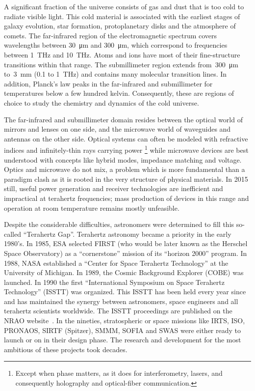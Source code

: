 A significant fraction of the universe consists of gas and dust that is too cold to radiate visible light.
This cold material is associated with the earliest stages of galaxy evolution, star formation, protoplanetary disks and the atmosphere of comets.
%
The far-infrared region of the electromagnetic spectrum covers wavelengths
between \SI{30}{\micro\meter} and \SI{300}{\micro\meter},
which correspond to frequencies
between \SI{1}{\tera\hertz} and \SI{10}{\tera\hertz}.
Atoms and ions have most of their fine-structure transitions within that range.
%
The submillimeter region extends from~\SI{300}{\micro\meter} to~\SI{3}{\milli\meter} (\num{0.1} to \SI{1}{\tera\hertz}) and contains many molecular transition lines.
%
In addition, Planck's law peaks in the far-infrared and submillimeter for temperatures below a few hundred kelvin.
%
Consequently, these are regions of choice to study the chemistry and dynamics of the cold universe.

The far-infrared and submillimeter domain resides between
the optical world of mirrors and lenses on one side,
and the microwave world of waveguides and antennas on the other side.
Optical systems can often be modeled with refractive indices and infinitely-thin rays carrying power%
\footnote{
    Except when phase matters, as it does for interferometry,
    lasers, and consequently holography and optical-fiber communication.
}
while microwave devices are best understood with concepts like hybrid modes, impedance matching and voltage.
Optics and microwave do not mix,
a problem which is more fundamental than a paradigm clash as it is rooted in the very structure of physical materials.
In 2015 still, useful power generation and receiver technologies are inefficient and impractical at terahertz frequencies;
mass production of devices in this range and operation at room temperature remains mostly unfeasible.

Despite the considerable difficulties, astronomers were determined to fill this so-called ``Terahertz Gap''.
Terahertz astronomy became a priority in the early 1980's.
In 1985, ESA selected FIRST (who would be later known as the Herschel Space Observatory) as a ``cornerstone'' mission of its ``horizon 2000'' program.
In 1988, NASA established a ``Center for Space Terahertz Technology'' at the University of Michigan.
In 1989, the Cosmic Background Explorer (COBE) was launched.
In 1990 the first ``International Symposium on Space Terahertz Technology'' (ISSTT) was organized.
This ISSTT has been held every year since and has maintained the synergy between astronomers, space engineers and all terahertz scientists worldwide.
The ISSTT proceedings are published on the NRAO website~\parencite{nrao:isstt}.
In the nineties, stratospheric or space missions like IRTS, ISO, PRONAOS, SIRTF (Spitzer), SMMM, SOFIA and SWAS were either ready to launch or on in their design phase.
The research and development for the most ambitious of these projects took decades.

